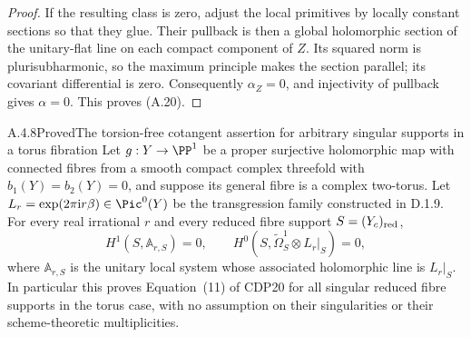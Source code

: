 \begin{proof}
If the resulting class is zero, adjust the local primitives by locally constant sections so that they glue. Their pullback is then a global holomorphic section of the unitary-flat line on each compact component of $Z$. Its squared norm is plurisubharmonic, so the maximum principle makes the section parallel; its covariant differential is zero. Consequently $\alpha_Z=0$, and injectivity of pullback gives $\alpha=0$. This proves (A.20).
\end{proof}

\begin{statement}{A.4.8}{Proved}{The torsion-free cotangent assertion for arbitrary singular supports in a torus fibration}
Let $g:Y\to\PP^1$ be a proper surjective holomorphic map with connected fibres from a smooth compact complex threefold with $b_1(Y)=b_2(Y)=0$, and suppose its general fibre is a complex two-torus. Let $L_r=\exp(2\pi\mathrm i r\beta)\in\Pic^0(Y)$ be the transgression family constructed in D.1.9. For every real irrational $r$ and every reduced fibre support $S=(Y_c)_{\rm red}$,
\[
 H^1(S,\mathbb A_{r,S})=0,
 \qquad
 H^0(S,\widetilde\Omega_S^1\otimes L_r|_S)=0,
 \tag{A.21}
\]
where $\mathbb A_{r,S}$ is the unitary local system whose associated holomorphic line is $L_r|_S$. In particular this proves Equation~(11) of CDP20 for all singular reduced fibre supports in the torus case, with no assumption on their singularities or their scheme-theoretic multiplicities.
\end{statement}
